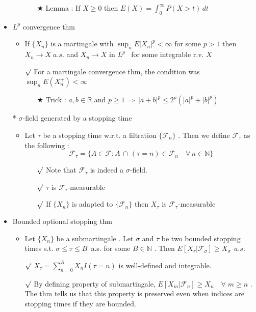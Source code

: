 \documentclass[12pt, A4]{article}
\newcommand{\rmk}{$\surd$}
\newcommand{\trick}{$\bigstar$}
\newcommand{\N}{\mathbb{N}}
\newcommand{\R}{\mathbb{R}}
\newcommand{\F}{\mathcal{F}}
\newcommand{\intersect}{\,\cap\,}
\newcommand{\foranyn}{\quad \forall \, n\in \N}
\begin{document}
\begin{itemize}
\begin{itemize}
$$		$$
		\begin{itemize}
			\item[\trick] Lemma : If $X\geq 0$ then $E(X)=\int_0^\infty P(X>t)\, dt$
		\end{itemize}
	\end{itemize}
	\item $L^p$ convergence thm
	\begin{itemize}
		\item If $\{X_n\}$ is a martingale with $\sup_n E|X_n|^p<\infty$ for some $p>1$ then $X_n\rightarrow X\; a.s.$ and $X_n\rightarrow X$ in $L^p$ \, for some integrable r.v. $X$
		\item[\rmk] For a martingale convergence thm, the condition was $\sup_n E(X_n^+)<\infty$
		\begin{itemize}
			\item[\trick] Trick : $a,b\in \R$ and $p\geq 1\,\Rightarrow\, |a+b|^p\leq 2^p(|a|^p+|b|^p)$  
		\end{itemize} 
	\end{itemize}
	\item[*] $\sigma$-field generated by a stopping time
	\begin{itemize}
		\item Let $\tau$ be a stopping time w.r.t. a filtration $\{\F_n\}$ . Then we define $\F_\tau$ as the following : 
		$$
			\F_\tau = \{A\in \F : A\intersect (\tau=n)\in \F_n \foranyn\}
		$$
		\begin{itemize}
			\item[\rmk] Note that $\F_\tau$ is indeed a $\sigma$-field. 
			\item[\rmk] $\tau$ is $\F_\tau$-measurable
			\item[\rmk] If $\{X_n\}$ is adapted to $\{\F_n\}$ then $X_\tau$ is $\F_\tau$-measurable
		\end{itemize}
	\end{itemize}
	\item Bounded optional stopping thm
	\begin{itemize}
		\item Let $\{X_n\}$ be a submartingale . Let $\sigma$ and $\tau$ be two bounded stopping times s.t. $\sigma\leq \tau\leq B$\;\, a.s. for some $B\in \N$ . Then $E[X_\tau |\F_\sigma] \geq X_\sigma\;\, a.s.$
		\item[\rmk] $X_\tau = \sum_{n=0}^B X_nI(\tau=n)$ is well-defined and integrable. 
		\item[\rmk] By defining property of submartingale, $E[X_m|\F_n]\geq X_n \quad \forall \;m\geq n$ . The thm tells us that this property is preserved even when indices are stopping times if they are bounded.

\end{itemize}
\end{itemize}
\end{document}
